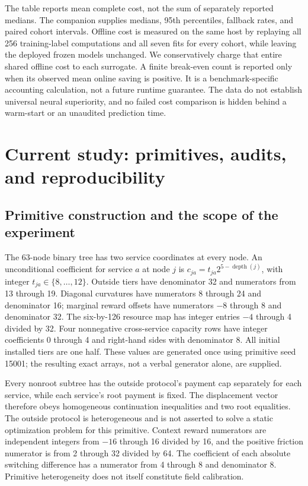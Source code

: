 \documentclass[11pt,letterpaper]{article}
\theoremstyle{definition}
\newcommand{\1}{\mathbf 1}
\begin{document}

The table reports mean complete cost, not the sum of separately reported medians. The companion supplies medians, 95th percentiles, fallback rates, and paired cohort intervals. Offline cost is measured on the same host by replaying all 256 training-label computations and all seven fits for every cohort, while leaving the deployed frozen models unchanged. We conservatively charge that entire shared offline cost to each surrogate. A finite break-even count is reported only when its observed mean online saving is positive. It is a benchmark-specific accounting calculation, not a future runtime guarantee. The data do not establish universal neural superiority, and no failed cost comparison is hidden behind a warm-start or an unaudited prediction time.


\section{Current study: primitives, audits, and reproducibility}\label{ec:r19-details}
\subsection{Primitive construction and the scope of the experiment}
The 63-node binary tree has two service coordinates at every node. An unconditional coefficient for service $a$ at node $j$ is $c_{ja}=t_{ja}2^{5-\operatorname{depth}(j)}$, with integer $t_{ja}\in\{8,\ldots,12\}$. Outside tiers have denominator 32 and numerators from 13 through 19. Diagonal curvatures have numerators 8 through 24 and denominator 16; marginal reward offsets have numerators $-8$ through 8 and denominator 32. The six-by-126 resource map has integer entries $-4$ through 4 divided by 32. Four nonnegative cross-service capacity rows have integer coefficients 0 through 4 and right-hand sides with denominator 8. All initial installed tiers are one half. These values are generated once using primitive seed 15001; the resulting exact arrays, not a verbal generator alone, are supplied.

Every nonroot subtree has the outside protocol's payment cap separately for each service, while each service's root payment is fixed. The displacement vector therefore obeys homogeneous continuation inequalities and two root equalities. The outside protocol is heterogeneous and is not asserted to solve a static optimization problem for this primitive. Context reward numerators are independent integers from $-16$ through 16 divided by 16, and the positive friction numerator is from 2 through 32 divided by 64. The coefficient of each absolute switching difference has a numerator from 4 through 8 and denominator 8. Primitive heterogeneity does not itself constitute field calibration.
\end{document}
